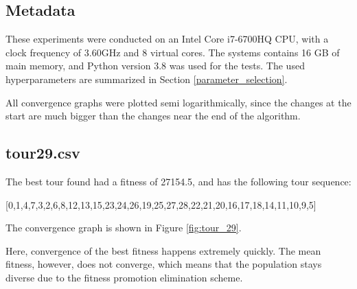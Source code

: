 \documentclass[a4paper,10pt]{article}
\newcommand{\ReplaceMe}[1]{{\color{blue}#1}}
\newcommand{\RemoveMe}[1]{{\color{purple}#1}}
\begin{document}

\subsection{Metadata}


These experiments were conducted on an Intel Core i7-6700HQ CPU, with a clock frequency of 3.60GHz and 8 virtual cores. The systems contains 16 GB of main memory, and Python version 3.8 was used for the tests. The used hyperparameters are summarized in Section \ref{parameter_selection}.

All convergence graphs were plotted semi logarithmically, since the changes at the start are much bigger than the changes near the end of the algorithm.

\subsection{tour29.csv}


The best tour found had a fitness of 27154.5, and has the following tour sequence: 

[0,1,4,7,3,2,6,8,12,13,15,23,24,26,19,25,27,28,22,21,20,16,17,18,14,11,10,9,5]

The convergence graph is shown in Figure \ref{fig:tour_29}.

Here, convergence of the best fitness happens extremely quickly. The mean fitness, however, does not converge, which means that the population stays diverse due to the fitness promotion elimination scheme. 
\end{document}
